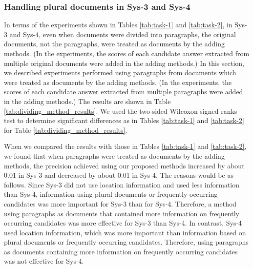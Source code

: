 \subsubsection{Handling plural documents in Sys-3 and Sys-4}

In terms of the experiments shown in Tables \ref{tab:task-1} and \ref{tab:task-2}, 
in Sys-3 and Sys-4, even when 
documents were divided into paragraphs, 
the original documents, 
not the paragraphs, were treated as documents by the adding methods. 
(In the experiments, the scores of each candidate answer
extracted from multiple original documents
were added in the adding methods.)
In this section, we described experiments 
performed using paragraphs from documents 
which were treated as documents by the adding methods. 
(In the experiments, the scores of each candidate answer
extracted from multiple paragraphs
were added in the adding methods.)
The results are shown in Table \ref{tab:dividing_method_results}. 
We used the two-sided Wilcoxon signed ranks test to determine significant differences 
as in Tables \ref{tab:task-1} and \ref{tab:task-2} for Table \ref{tab:dividing_method_results}. 

When we compared the results with those in Tables \ref{tab:task-1} and \ref{tab:task-2}, 
we found that 
when paragraphs were treated as documents by the adding methods, 
the precision achieved  using our proposed methods increased by about 0.01 in Sys-3
and decreased by about 0.01 in Sys-4. 
The reasons would be as follows. 
Since Sys-3 did not use location information 
and used less information than Sys-4, 
information using plural documents or 
frequently occurring candidates was more important for Sys-3 than for Sys-4. 
Therefore, a method using paragraphs as documents 
that contained more information on frequently occurring candidates 
was more effective for Sys-3 than Sys-4. 
In contrast, Sys-4 used location information, which 
was more important than 
information based on plural documents or frequently occurring candidates. 
Therefore, using paragraphs as documents 
containing more information on frequently occurring candidates 
was not effective for Sys-4. 

